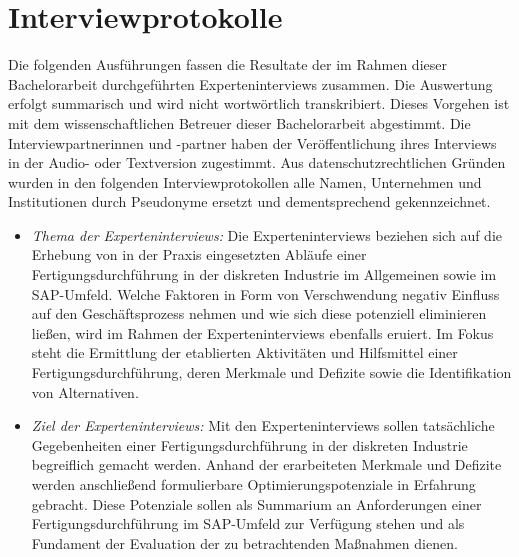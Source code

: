 \chapter{Interviewprotokolle}\label{ah:protokolle}

Die folgenden Ausführungen fassen die Resultate der im Rahmen dieser Bachelorarbeit durchgeführten Experteninterviews zusammen.
Die Auswertung erfolgt summarisch und wird nicht wortwörtlich transkribiert.
Dieses Vorgehen ist mit dem wissenschaftlichen Betreuer dieser Bachelorarbeit abgestimmt.
Die Interviewpartnerinnen und -partner haben der Veröffentlichung ihres Interviews in der Audio- oder Textversion zugestimmt.
Aus datenschutzrechtlichen Gründen wurden in den folgenden Interviewprotokollen alle Namen, Unternehmen und Institutionen durch Pseudonyme ersetzt und dementsprechend gekennzeichnet.

\begin{itemize}
  \item
        \textit{Thema der Experteninterviews:} 
        Die Experteninterviews beziehen sich auf die Erhebung von in der Praxis eingesetzten Abläufe einer Fertigungsdurchführung in der diskreten Industrie im Allgemeinen sowie im SAP-Umfeld.
        Welche Faktoren in Form von Verschwendung negativ Einfluss auf den Geschäftsprozess nehmen und wie sich diese potenziell eliminieren ließen, wird im Rahmen der Experteninterviews ebenfalls eruiert.
        Im Fokus steht die Ermittlung der etablierten Aktivitäten und Hilfsmittel einer Fertigungsdurchführung, deren Merkmale und Defizite sowie die Identifikation von Alternativen.
  \item 
        \textit{Ziel der Experteninterviews:}
        Mit den Experteninterviews sollen tatsächliche Gegebenheiten einer Fertigungsdurchführung in der diskreten Industrie begreiflich gemacht werden. 
        Anhand der erarbeiteten Merkmale und Defizite werden anschließend formulierbare Optimierungspotenziale in Erfahrung gebracht.
        Diese Potenziale sollen als Summarium an Anforderungen einer Fertigungsdurchführung im SAP-Umfeld zur Verfügung stehen und als Fundament der Evaluation der zu betrachtenden Maßnahmen dienen.
\end{itemize}

\newpage

\newpage

\newpage

